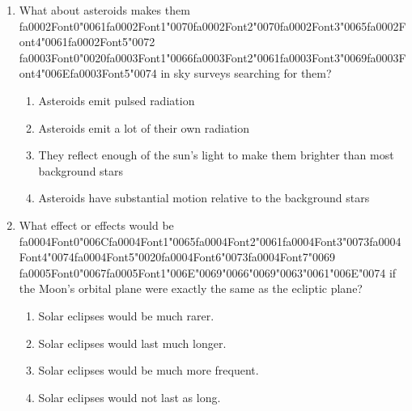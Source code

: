 \documentclass[12pt]{article}
\begin{document}
\begin{enumerate}[label=\arabic*.]
\begin{enumerate}[label=(\alph*)]
\end{enumerate}
\item What about asteroids makes them {\csname fa0002Font0\endcsname\char"0061}{\csname fa0002Font1\endcsname\char"0070}{\csname fa0002Font2\endcsname\char"0070}{\csname fa0002Font3\endcsname\char"0065}{\csname fa0002Font4\endcsname\char"0061}{\csname fa0002Font5\endcsname\char"0072} {\csname fa0003Font0\endcsname\char"0020}{\csname fa0003Font1\endcsname\char"0066}{\csname fa0003Font2\endcsname\char"0061}{\csname fa0003Font3\endcsname\char"0069}{\csname fa0003Font4\endcsname\char"006E}{\csname fa0003Font5\endcsname\char"0074} in sky surveys searching for them?
\begin{enumerate}[label=(\alph*)]
    \item Asteroids emit pulsed radiation
    \item Asteroids emit a lot of their own radiation
    \item They reflect enough of the sun's light to make them brighter than most background stars
    \item Asteroids have substantial motion relative to the background stars
\end{enumerate}
\item What effect or effects would be {\csname fa0004Font0\endcsname\char"006C}{\csname fa0004Font1\endcsname\char"0065}{\csname fa0004Font2\endcsname\char"0061}{\csname fa0004Font3\endcsname\char"0073}{\csname fa0004Font4\endcsname\char"0074}{\csname fa0004Font5\endcsname\char"0020}{\csname fa0004Font6\endcsname\char"0073}{\csname fa0004Font7\endcsname\char"0069} {\csname fa0005Font0\endcsname\char"0067}{\csname fa0005Font1\endcsname\char"006E}{\char"0069}{\char"0066}{\char"0069}{\char"0063}{\char"0061}{\char"006E}{\char"0074} if the Moon's orbital plane were exactly
the same as the ecliptic plane?
\begin{enumerate}[label=(\alph*)]
    \item Solar eclipses would be much rarer.
    \item Solar eclipses would last much longer.
    \item Solar eclipses would be much more frequent.
    \item Solar eclipses would not last as long.
\end{enumerate}
\end{enumerate}
\end{document}
